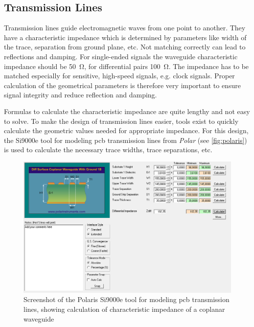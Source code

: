 \subsection{Transmission Lines}
Transmission lines guide electromagnetic waves from one point to another. 
They have a characteristic impedance which is determined by parameters like width of the trace, separation from ground plane, etc.  
Not matching correctly can lead to reflections and damping.
For single-ended signals the waveguide characteristic impedance should be \SI{50}{\ohm}, for differential pairs \SI{100}{\ohm}.
The impedance has to be matched especially for sensitive, high-speed signals, e.g. clock signals. 
Proper calculation of the geometrical parameters is therefore very important to ensure signal integrity and reduce reflection and damping. 

Formulas to calculate the characteristic impedance are quite lengthy and not easy to solve.
To make the design of transmission lines easier, tools exist to quickly calculate the geometric values needed for appropriate impedance.
For this design, the Si9000e tool for modeling \gls{pcb} transmission lines from \textit{Polar} (see \autoref{fig:polaris}) is used to calculate the necessary trace widths, trace separations, etc.

\begin{figure}[tbh]
	\centering
	\includegraphics[width = \textwidth]{chap/04-work/img/polaris}
	\caption[Screenshot of the Polaris Si9000e]{Screenshot of the Polaris Si9000e tool for modeling \gls{pcb} transmission lines, showing calculation of characteristic impedance of a coplanar waveguide}
	\label{fig:polaris}
\end{figure}

